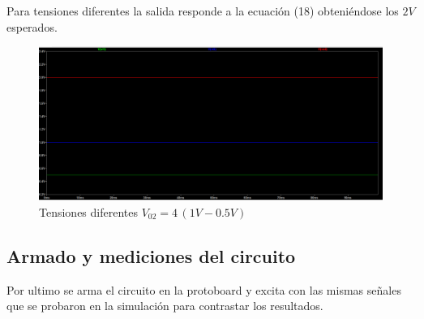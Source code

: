 \documentclass[12pt]{article}
\begin{document}
		Para tensiones diferentes la salida responde a la ecuación (18) obteniéndose los $2V$ esperados.
		\begin{figure}[h]
			\centering
			\includegraphics[width=1\linewidth]{Simulaciones-Resultados/Circuito1_Vo2-Vi1-Vi2}
			\caption{Tensiones diferentes $V_{02}=4\,(1V-0.5V)$}
			\label{fig:circuito1vo2-vi1-vi2}
		\end{figure}
		
			\subsection{Armado y mediciones del circuito}
			Por ultimo se arma el circuito en la protoboard y excita  con las mismas señales que
			se probaron en la simulación para contrastar los resultados.
			
		
		
		
		
		
	
		
		
\end{document}
